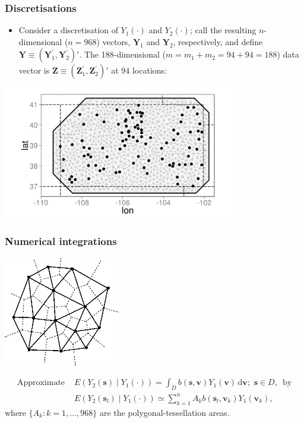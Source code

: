 \documentclass{beamer}
\newcommand{\svec} {\textbf{s}}
\newcommand{\s}{\mathbf{s}}
\renewcommand{\v}{\mathbf{v}}
\renewcommand{\d}{\mathrm{d}}
\newcommand{\Yvec}{\mathbf{Y}}
\newcommand{\Zvec}{\mathbf{Z}}
\newcommand{\E}{E}
\begin{document}
\begin{frame}
\frametitle{Discretisations}
\begin{itemize}
\item Consider a discretisation of $Y_1(\cdot)$ and $Y_2(\cdot)$; call the resulting $n$-dimensional ($n=968$) vectors, $\Yvec_1$ and $\Yvec_2$, respectively, and define $\Yvec \equiv (\Yvec_1^{\prime},\Yvec_2^{\prime})'$. The 188-dimensional ($m=m_1+m_2=94+94=188$) data vector is $\Zvec \equiv (\Zvec_1^{\prime},\Zvec_2^{\prime})'$ at 94 locations:
\end{itemize}

\vspace{-0.25in}
\begin{center}
\includegraphics[width=4in]{meshplot.png}
\end{center}

\end{frame}



\begin{frame}
\frametitle{Numerical integrations}

\vspace{-.8cm}
\begin{center}
\includegraphics[width=2in]{vor3.png}
\end{center}
\vspace{-.5cm}
\begin{align*}
\mbox{Approximate }&\displaystyle \E\left(Y_2(\s)\mid Y_1(\cdot)\right)=\int_D{b(\s,\v)Y_1(\v)\,\d \v};\,\,\s\in D,\,\mbox{ by}\\
&\E(Y_2(\svec_l) \mid  Y_1(\cdot)) \simeq \sum_{k=1}^{n} A_k b(\svec_l,\v_k)Y_1(\v_k),
\end{align*}
where $\{A_k:k=1,\ldots,968\}$ are the polygonal-tessellation areas.
\end{frame}
\end{document}
